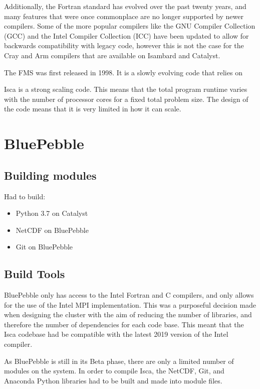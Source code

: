 \documentclass[a4paper,11pt]{report}
\begin{document}
Additionally, the Fortran standard has evolved over the past twenty years, and many features that were once commonplace are no longer supported by newer compilers. Some of the more popular compilers like the GNU Compiler Collection (GCC) and the Intel Compiler Collection (ICC) have been updated to allow for backwards compatibility with legacy code, however this is not the case for the Cray and Arm compilers that are available on Isambard and Catalyst.
\par
The FMS was first released in 1998. It is a slowly evolving code that relies on 
\par
Isca is a strong scaling code. This means that the total program runtime varies with the number of processor cores for a fixed total problem size. The design of the code means that it is very limited in how it can scale. 


\par









\section{BluePebble}

\subsection{Building modules}

Had to build: 
\begin{itemize}
	\item Python 3.7 on Catalyst
	\item NetCDF on BluePebble
	\item Git on BluePebble
\end{itemize}

\subsection{Build Tools}
BluePebble only has access to the Intel Fortran and C compilers, and only allows for the use of the Intel MPI implementation. This was a purposeful decision made when designing the cluster with the aim of reducing the number of libraries, and therefore the number of dependencies for each code base. This meant that the Isca codebase had be compatible with the latest 2019 version of the Intel compiler. 
\par
As BluePebble is still in its Beta phase, there are only a limited number of modules on the system. In order to compile Isca, the NetCDF, Git, and Anaconda Python libraries had to be built and made into module files. 
\end{document}
